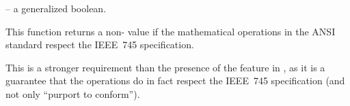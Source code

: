 \documentclass[../Environment-Queries.tex]{subfiles}
\begin{document}

\DSyntax{}

 
\RArrow {}

\DArgsNValues{}

 -- a generalized boolean.


\DDescription{}

This function returns a non- value if the mathematical
operations in the ANSI \CL{} standard \cite{1996:ANSIHyperSpec} respect the
IEEE~745 specification.

\DNotes{}

This is a stronger requirement than the
presence of the  feature in
, as it is a guarantee that the operations do in
fact respect the IEEE~745 specification (and not only ``purport to
conform'').
\end{document}
